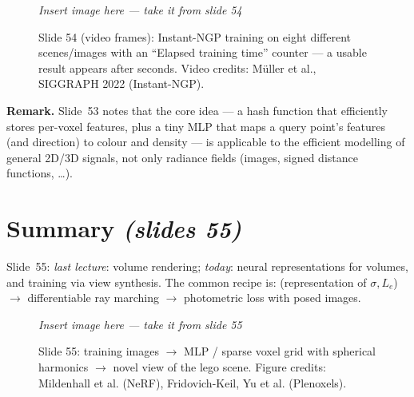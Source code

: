 \documentclass[11pt,a4paper]{article}
\newcommand{\Le}{L_e}
\newcommand{\sref}[1]{\texorpdfstring{\emph{(slides #1)}}{(slides #1)}}
\theoremstyle{definition}
\theoremstyle{plain}
\newcommand{\slideimg}[3]{%
\begin{figure}[H]
\centering
\begin{tcolorbox}[enhanced,colback=white,colframe=white,boxrule=0pt,sharp corners,overlay={\draw[dashed,gray,thick] (frame.south west) rectangle (frame.north east);},
  width=0.92\linewidth,height=#2,valign=center,halign=center]
{\color{gray}\itshape Insert image here --- take it from slide #1}
\end{tcolorbox}
\caption{#3}
\end{figure}}
\begin{document}
\slideimg{54}{4.8cm}{Slide 54 (video frames): Instant-NGP training on eight different scenes/images with an ``Elapsed training time'' counter --- a usable result appears after seconds. Video credits: M\"uller et al., SIGGRAPH 2022 (Instant-NGP).}

\textbf{Remark.} Slide~53 notes that the core idea --- a hash function that efficiently stores per-voxel features, plus a tiny MLP that maps a query point's features (and direction) to colour and density --- is applicable to the efficient modelling of general 2D/3D signals, not only radiance fields (images, signed distance functions, \dots).

\section{Summary \sref{55}}

Slide~55: \emph{last lecture}: volume rendering; \emph{today}: neural representations for volumes, and training via view synthesis. The common recipe is: (representation of $\sigma,\Le$) $\to$ differentiable ray marching $\to$ photometric loss with posed images.

\slideimg{55}{4.4cm}{Slide 55: training images $\to$ MLP / sparse voxel grid with spherical harmonics $\to$ novel view of the lego scene. Figure credits: Mildenhall et al. (NeRF), Fridovich-Keil, Yu et al. (Plenoxels).}
\end{document}
